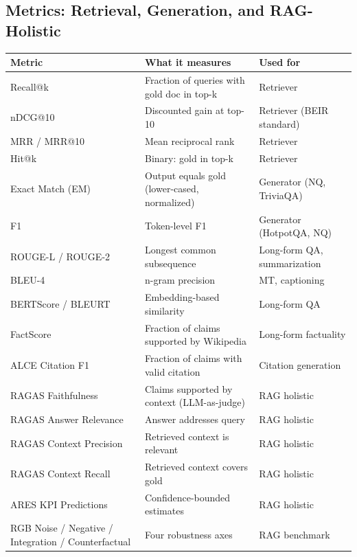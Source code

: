 \subsection{Metrics: Retrieval, Generation, and RAG-Holistic}\label{metrics-retrieval-generation-and-rag-holistic}

{\def\LTcaptype{none} %
\begin{longtable}[]{@{}
  >{\raggedright\arraybackslash}p{}
  >{\raggedright\arraybackslash}p{}
  >{\raggedright\arraybackslash}p{}@{}}
\toprule\noalign{}
\begin{minipage}[b]{\linewidth}\raggedright
Metric
\end{minipage} & \begin{minipage}[b]{\linewidth}\raggedright
What it measures
\end{minipage} & \begin{minipage}[b]{\linewidth}\raggedright
Used for
\end{minipage} \\
\midrule\noalign{}
\endhead
\bottomrule\noalign{}
\endlastfoot
Recall@k & Fraction of queries with gold doc in top-k & Retriever \\
nDCG@10 & Discounted gain at top-10 & Retriever (BEIR standard) \\
MRR / MRR@10 & Mean reciprocal rank & Retriever \\
Hit@k & Binary: gold in top-k & Retriever \\
Exact Match (EM) & Output equals gold (lower-cased, normalized) & Generator (NQ, TriviaQA) \\
F1 & Token-level F1 & Generator (HotpotQA, NQ) \\
ROUGE-L / ROUGE-2 & Longest common subsequence & Long-form QA, summarization \\
BLEU-4 & n-gram precision & MT, captioning \\
BERTScore / BLEURT & Embedding-based similarity & Long-form QA \\
FactScore & Fraction of claims supported by Wikipedia & Long-form factuality \\
ALCE Citation F1 & Fraction of claims with valid citation & Citation generation \\
RAGAS Faithfulness & Claims supported by context (LLM-as-judge) & RAG holistic \\
RAGAS Answer Relevance & Answer addresses query & RAG holistic \\
RAGAS Context Precision & Retrieved context is relevant & RAG holistic \\
RAGAS Context Recall & Retrieved context covers gold & RAG holistic \\
ARES KPI Predictions & Confidence-bounded estimates & RAG holistic \\
RGB Noise / Negative / Integration / Counterfactual & Four robustness axes & RAG benchmark \\
\end{longtable}
}

